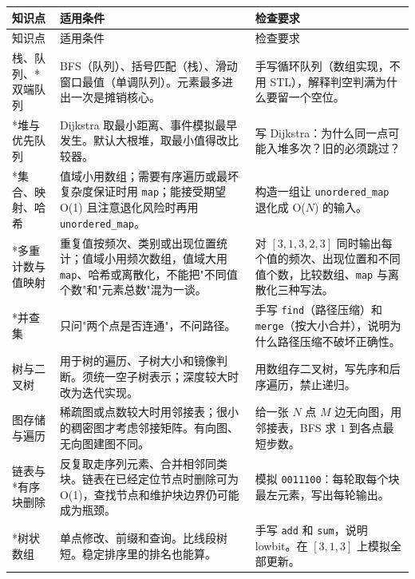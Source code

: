 \documentclass[a4paper,11pt]{article}
\newcommand{\code}[1]{\texttt{#1}}
\begin{document}
\begin{longtable}{L{2.4cm} L{7.5cm} L{6.8cm}}
\toprule
知识点 & 适用条件 & 检查要求 \\
\midrule
\endfirsthead
\toprule
知识点 & 适用条件 & 检查要求 \\
\midrule
\endhead
\endfoot
\bottomrule
\endlastfoot

栈、队列、*双端队列
& BFS（队列）、括号匹配（栈）、滑动窗口最值（单调队列）。元素最多进出一次是摊销核心。
& 手写循环队列（数组实现，不用 STL），解释判空判满为什么要留一个空位。 \\[2mm]

*堆与优先队列
& Dijkstra 取最小距离、事件模拟最早发生。默认大根堆，取最小值得改比较器。
& 写 Dijkstra：为什么同一点可能入堆多次？旧的必须跳过？ \\[2mm]

*集合、映射、哈希
& 值域小用数组；需要有序遍历或最坏复杂度保证时用 \code{map}；能接受期望 O(1) 且注意退化风险时再用 \code{unordered\_map}。
& 构造一组让 \code{unordered\_map} 退化成 O($N$) 的输入。 \\[2mm]

*多重计数与值映射
& 重复值按频次、类别或出现位置统计；值域小用频次数组，值域大用 \code{map}、哈希或离散化，不能把"不同值个数"和"元素总数"混为一谈。
& 对 $[3,1,3,2,3]$ 同时输出每个值的频次、出现位置和不同值个数，比较数组、\code{map} 与离散化三种写法。 \\[2mm]

*并查集
& 只问"两个点是否连通"，不问路径。
& 手写 \code{find}（路径压缩）和 \code{merge}（按大小合并），说明为什么路径压缩不破坏正确性。 \\[2mm]

树与二叉树
& 用于树的遍历、子树大小和镜像判断。须统一空子树表示；深度较大时改为迭代实现。
& 用数组存二叉树，写先序和后序遍历，禁止递归。 \\[2mm]

图存储与遍历
& 稀疏图或点数较大时用邻接表；很小的稠密图才考虑邻接矩阵。有向图、无向图建图不同。
& 给一张 $N$ 点 $M$ 边无向图，用邻接表，BFS 求 $1$ 到各点最短步数。 \\[2mm]

链表与*有序块删除
& 反复取走序列元素、合并相邻同类块。链表在已经定位节点时删除可为 O(1)，查找节点和维护块边界仍可能成为瓶颈。
& 模拟 \code{0011100}：每轮取每个块最左元素，写出每轮输出。 \\[2mm]

*树状数组
& 单点修改、前缀和查询。比线段树短。稳定排序里的排名也能算。
& 手写 \code{add} 和 \code{sum}，说明 lowbit。在 $[3,1,3]$ 上模拟全部更新。 \\[2mm]


\end{longtable}
\end{document}
